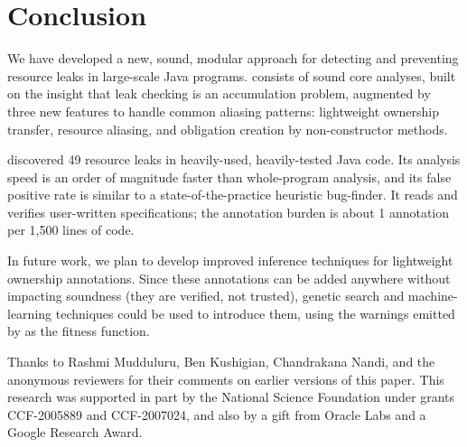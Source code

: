 \documentclass[sigconf]{acmart}
\begin{document}
\maketitle



















\section{Conclusion}

We have developed a new, sound, modular approach for detecting and preventing
resource leaks in large-scale Java programs.  \Tool consists of sound core
analyses, built on the insight that leak checking is an accumulation problem,
augmented by three new features to handle common aliasing patterns: lightweight
ownership transfer, resource aliasing, and obligation creation by
non-constructor methods.

\Tool
discovered 49 resource leaks in heavily-used, heavily-tested Java code.
Its analysis speed is an order of magnitude faster
than whole-program analysis, and its false positive rate is similar to a
state-of-the-practice heuristic bug-finder.
It reads and verifies user-written specifications; the annotation burden
is about 1 annotation per 1,500 lines of code.

In future work, we plan to develop
improved inference techniques for lightweight ownership annotations.  Since
these annotations can be added anywhere without impacting soundness (they
are verified, not trusted), genetic
search
and machine-learning techniques could be used to introduce them, using the
warnings emitted by \tool as the fitness function.


\begin{acks}
Thanks to Rashmi Mudduluru, Ben Kushigian, Chandrakana Nandi, and the anonymous
reviewers for their comments on earlier versions of this paper.  This research
was supported in part by the National Science Foundation under grants
CCF-2005889 and CCF-2007024, and also by a gift from Oracle Labs and a Google
Research Award.

\end{acks}




\end{document}
